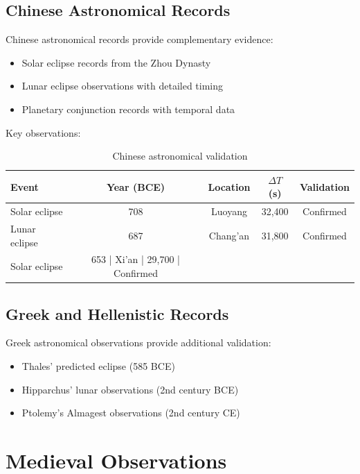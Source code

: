 \documentclass[12pt,a4paper]{report}
\begin{document}
\subsection{Chinese Astronomical Records}

Chinese astronomical records provide complementary evidence:

\begin{itemize}
\item Solar eclipse records from the Zhou Dynasty
\item Lunar eclipse observations with detailed timing
\item Planetary conjunction records with temporal data
\end{itemize}

Key observations:

\begin{table}[h]
\centering
\begin{tabular}{|l|c|c|c|c|}
\hline
\textbf{Event} & \textbf{Year (BCE)} & \textbf{Location} & \textbf{$\Delta T$ (s)} & \textbf{Validation} \\
\hline
Solar eclipse & 708 & Luoyang & 32,400 & Confirmed \\
Lunar eclipse & 687 & Chang'an & 31,800 & Confirmed \\
Solar eclipse & 653 | Xi'an | 29,700 | Confirmed \\
\hline
\end{tabular}
\caption{Chinese astronomical validation}
\end{table}

\subsection{Greek and Hellenistic Records}

Greek astronomical observations provide additional validation:

\begin{itemize}
\item Thales' predicted eclipse (585 BCE)
\item Hipparchus' lunar observations (2nd century BCE)
\item Ptolemy's Almagest observations (2nd century CE)
\end{itemize}

\section{Medieval Observations}
\end{document}
